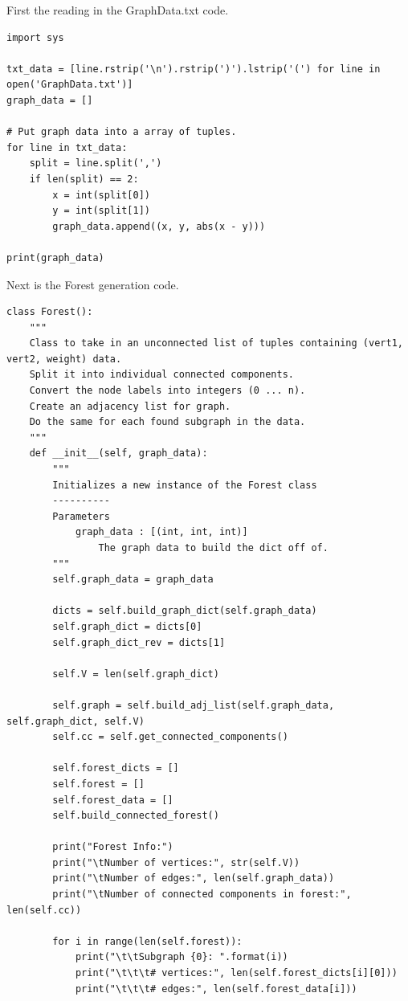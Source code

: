 \documentclass{article}
\begin{document}
\begin{enumerate}
    First the reading in the GraphData.txt code.

    \begin{lstlisting}
import sys

txt_data = [line.rstrip('\n').rstrip(')').lstrip('(') for line in open('GraphData.txt')]
graph_data = []

# Put graph data into a array of tuples.
for line in txt_data:
    split = line.split(',')
    if len(split) == 2:
        x = int(split[0])
        y = int(split[1])
        graph_data.append((x, y, abs(x - y)))
        
print(graph_data)        
    \end{lstlisting}

    Next is the Forest generation code.

    \begin{lstlisting}
class Forest():
    """
    Class to take in an unconnected list of tuples containing (vert1, vert2, weight) data.
    Split it into individual connected components.
    Convert the node labels into integers (0 ... n).
    Create an adjacency list for graph.
    Do the same for each found subgraph in the data.
    """
    def __init__(self, graph_data):
        """
        Initializes a new instance of the Forest class
        ----------
        Parameters
            graph_data : [(int, int, int)]
                The graph data to build the dict off of.
        """          
        self.graph_data = graph_data

        dicts = self.build_graph_dict(self.graph_data)        
        self.graph_dict = dicts[0]
        self.graph_dict_rev = dicts[1]                
        
        self.V = len(self.graph_dict)
        
        self.graph = self.build_adj_list(self.graph_data, self.graph_dict, self.V)
        self.cc = self.get_connected_components()
        
        self.forest_dicts = []
        self.forest = []
        self.forest_data = []
        self.build_connected_forest()

        print("Forest Info:")
        print("\tNumber of vertices:", str(self.V))
        print("\tNumber of edges:", len(self.graph_data))
        print("\tNumber of connected components in forest:", len(self.cc))
        
        for i in range(len(self.forest)):
            print("\t\tSubgraph {0}: ".format(i))
            print("\t\t\t# vertices:", len(self.forest_dicts[i][0]))            
            print("\t\t\t# edges:", len(self.forest_data[i]))            
        

\end{lstlisting}
\end{enumerate}
\end{document}

